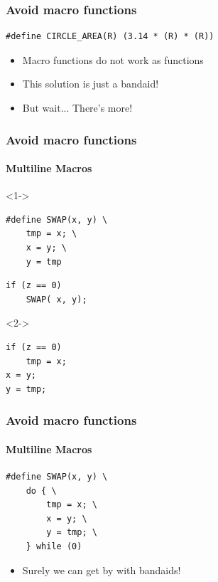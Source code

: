 \documentclass[table]{beamer}
\newcounter{rulecount}
\newcommand{\declarerule}{\textbf{\color{themeblue}{Rule \therulecount:}} }
\begin{document}
\begin{frame}[fragile]
    \frametitle{\declarerule Avoid macro functions}
\begin{lstlisting}[title=\textbf{Macro Solution:} Wrap everything in brackets]
#define CIRCLE_AREA(R) (3.14 * (R) * (R))
\end{lstlisting}
\begin{itemize}
    \item<2->Macro functions do not work as functions
    \item<2->This solution is just a bandaid!
    \item<3->But wait... There's more!
\end{itemize}
\end{frame}

\begin{frame}[fragile]
    \frametitle{\declarerule Avoid macro functions}
    \framesubtitle{Multiline Macros}
    
\begin{uncoverenv}<1->
\begin{lstlisting}[title=A multiline macro that swaps the values of two variables]
#define SWAP(x, y) \
    tmp = x; \
    x = y; \
    y = tmp
\end{lstlisting}

\begin{lstlisting}[title=You write]
if (z == 0)
    SWAP( x, y);
\end{lstlisting}
\end{uncoverenv}

\begin{uncoverenv}<2->
\begin{lstlisting}[title=The compiler sees]
if (z == 0)
    tmp = x;
x = y;
y = tmp;
\end{lstlisting}
\end{uncoverenv}
\end{frame}

\begin{frame}[fragile]
    \frametitle{\declarerule Avoid macro functions}
    \framesubtitle{Multiline Macros}
    
    \begin{lstlisting}[title=\textbf{Bandaid solution:} wrap in do-while]
#define SWAP(x, y) \
    do { \
        tmp = x; \
        x = y; \
        y = tmp; \
    } while (0)
\end{lstlisting}
\begin{itemize}
    \item Surely we can get by with bandaids!
\end{itemize}
\end{frame}
\end{document}
